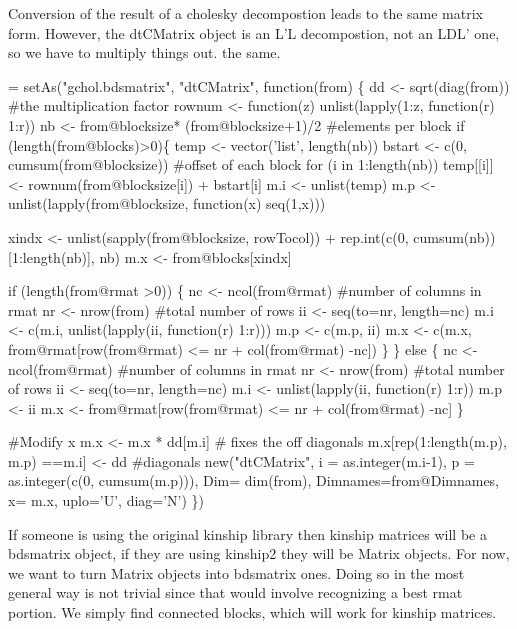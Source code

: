 \documentclass{article}
\begin{document}
Conversion of the result of a cholesky decompostion leads to the
same matrix form.  However, the dtCMatrix object is an L'L
decompostion, not an LDL' one, so we have to multiply things
out.
the same.
\begin{nwchunk}
=
 setAs("gchol.bdsmatrix", "dtCMatrix", function(from) \{
     dd <- sqrt(diag(from))  #the multiplication factor
     rownum <- function(z) unlist(lapply(1:z, function(r) 1:r))
     nb <- from@blocksize* (from@blocksize+1)/2  #elements per block
     if (length(from@blocks)>0)\{
         temp <- vector('list', length(nb))
         bstart <- c(0, cumsum(from@blocksize)) #offset of each block
         for (i in 1:length(nb)) 
             temp[[i]] <- rownum(from@blocksize[i]) + bstart[i]
         m.i <- unlist(temp)
         m.p <- unlist(lapply(from@blocksize, function(x) seq(1,x)))
 
         xindx <- unlist(sapply(from@blocksize, rowTocol)) +
                  rep.int(c(0, cumsum(nb))[1:length(nb)], nb)      
         m.x <- from@blocks[xindx]
 
         if (length(from@rmat >0)) \{
             nc <- ncol(from@rmat)  #number of columns in rmat
             nr <- nrow(from)     #total number of rows
             ii <- seq(to=nr, length=nc)
             m.i <- c(m.i, unlist(lapply(ii, function(r) 1:r)))
             m.p <- c(m.p, ii)
             m.x <- c(m.x, from@rmat[row(from@rmat) <= nr + col(from@rmat) -nc])
         \}
     \}
     else \{
         nc <- ncol(from@rmat)  #number of columns in rmat
         nr <- nrow(from)     #total number of rows
         ii <- seq(to=nr, length=nc)
         m.i <- unlist(lapply(ii, function(r) 1:r))
         m.p <- ii
         m.x <- from@rmat[row(from@rmat) <= nr + col(from@rmat) -nc]
     \} 
         
     #Modify x
     m.x <- m.x * dd[m.i]  # fixes the off diagonals
     m.x[rep(1:length(m.p), m.p) ==m.i] <- dd  #diagonals
     new("dtCMatrix", 
         i = as.integer(m.i-1),
         p = as.integer(c(0, cumsum(m.p))),
         Dim= dim(from),
         Dimnames=from@Dimnames,
         x= m.x,
         uplo='U',
         diag='N')
 \})             
\end{nwchunk}

If someone is using the original kinship library then kinship
matrices will be a bdsmatrix object, if they are using
kinship2 they will be Matrix objects.
For now, we want to turn Matrix objects into bdsmatrix ones.
Doing so in the most general way is not trivial since that would
involve recognizing a best rmat portion.  We simply find connected
blocks, which will work for kinship matrices.  
\end{document}
